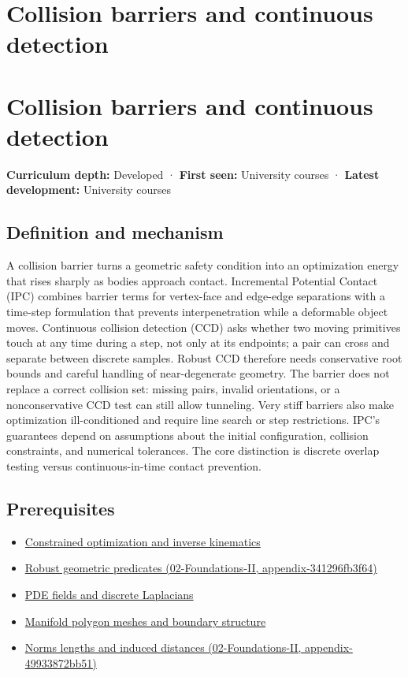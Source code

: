 \hypertarget{appendix-a9ba01fa72a6}{}
\section*{Collision barriers and continuous detection}
\section{Collision barriers and continuous detection}\label{collision-barriers-and-continuous-detection}

\textbf{Curriculum depth:} Developed · \textbf{First seen:} University courses · \textbf{Latest development:} University courses

\subsection{Definition and mechanism}\label{definition-and-mechanism}

A collision barrier turns a geometric safety condition into an optimization energy that rises sharply as bodies approach contact. Incremental Potential Contact (IPC) combines barrier terms for vertex-face and edge-edge separations with a time-step formulation that prevents interpenetration while a deformable object moves. Continuous collision detection (CCD) asks whether two moving primitives touch at any time during a step, not only at its endpoints; a pair can cross and separate between discrete samples. Robust CCD therefore needs conservative root bounds and careful handling of near-degenerate geometry. The barrier does not replace a correct collision set: missing pairs, invalid orientations, or a nonconservative CCD test can still allow tunneling. Very stiff barriers also make optimization ill-conditioned and require line search or step restrictions. IPC's guarantees depend on assumptions about the initial configuration, collision constraints, and numerical tolerances. The core distinction is discrete overlap testing versus continuous-in-time contact prevention.

\subsection{Prerequisites}\label{prerequisites}

\begin{itemize}
\tightlist
\item
  \hyperref[appendix-29f4bea4c2bb]{Constrained optimization and inverse kinematics}
\item
  \href{}{Robust geometric predicates (02-Foundations-II, appendix-341296fb3f64)}
\item
  \hyperref[appendix-1988d465c119]{PDE fields and discrete Laplacians}
\item
  \hyperref[appendix-fab348609369]{Manifold polygon meshes and boundary structure}
\item
  \href{}{Norms lengths and induced distances (02-Foundations-II, appendix-49933872bb51)}
\end{itemize}

